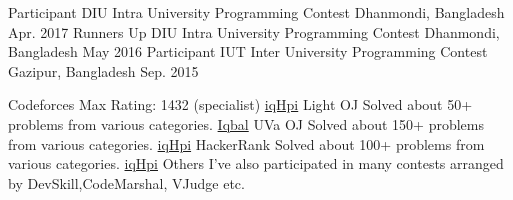 \newcommand*{\myLink}{\headersocialstyle{\faExternalLink}}


\begin{cvhonors}
  \cvhonor
    {Participant}
    {DIU Intra University Programming Contest}
    {Dhanmondi, Bangladesh}
    {Apr. 2017}
  \cvhonor
    {Runners Up}
    {DIU Intra University Programming Contest}
    {Dhanmondi, Bangladesh}
    {May 2016}
  \cvhonor
    {Participant}
    {IUT Inter University Programming Contest}
    {Gazipur, Bangladesh}
    {Sep. 2015}
\end{cvhonors}

\begin{cvhonors}
  \cvhonor
    {Codeforces}
    {Max Rating: 1432 (specialist)}
    {}
    {\href{http://codeforces.com/profile/iqHpi}{{\myLink} iqHpi}}
  \cvhonor
    {Light OJ}
    {Solved about 50+ problems from various categories.}
    {}
    {\href{http://www.lightoj.com/volume_userstat.php?user_id=19475}{{\myLink} Iqbal}}
  \cvhonor
    {UVa OJ}
    {Solved about 150+ problems from various categories.}
    {}
    {\href{http://uhunt.felix-halim.net/id/553883}{{\myLink} iqHpi}}
  \cvhonor
    {HackerRank}
    {Solved about 100+ problems from various categories.}
    {}
    {\href{https://www.hackerrank.com/iqHpi}{{\myLink} iqHpi}}    
  \cvhonor
    {Others}
    {I've also participated in many contests arranged by DevSkill,CodeMarshal, VJudge etc.}
    {}
    {}
\end{cvhonors}
